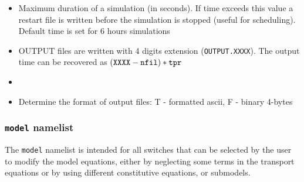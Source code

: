 \begin{itemize}
\item
{}
{Maximum duration of a simulation (in seconds). If time exceeds this value
a restart file is written before the simulation is stopped (useful for
scheduling). Default time is set for 6 hours simulations}

\item
{}
{OUTPUT files are written with 4 digits extension ({\tt OUTPUT.XXXX}). 
The output time can be recovered as $({\tt XXXX - nfil})* {\tt tpr}$ }

\item
{}
{}

\item
{}
{Determine the format of output files: T - formatted ascii, 
F - binary 4-bytes }

\end{itemize}

\subsubsection{{\tt model} namelist}
The {\tt model} namelist is intended for all switches that can be selected
by the user to modify the model equations, either by neglecting some terms
in the transport equations or by using different constitutive equations,
or submodels.

